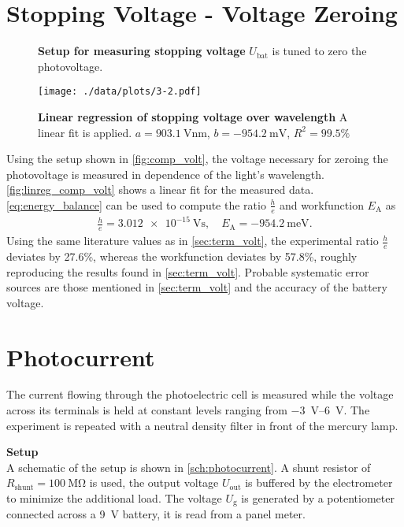 \section{Stopping Voltage - Voltage Zeroing}%
\begin{figure}[tbp]
	\centering
	\caption[Setup for measuring stopping voltage]{\textbf{Setup for measuring stopping voltage} $U_\text{bat}$ is tuned to zero the photovoltage.}
	\label{fig:comp_volt}
\end{figure}
\begin{figure}[tbp]
	\centering
	\texttt{[image: ./data/plots/3-2.pdf]}
	\caption[Linear regression of stopping voltage over wavelength]{\textbf{Linear regression of stopping voltage over wavelength} A linear fit is applied. $a=\SI{903.1}{\volt\nm}$, $b=\SI{-954.2}{\milli\V}$, $R^2=99.5\%$}
	\label{fig:linreg_comp_volt}
\end{figure}
Using the setup shown in \autoref{fig:comp_volt}, the voltage necessary for zeroing the photovoltage is measured in dependence of the light's wavelength.
\autoref{fig:linreg_comp_volt} shows a linear fit for the measured data.
\autoref{eq:energy_balance} can be used to compute the ratio $\frac{h}{e}$ and workfunction $E_\text{A}$ as
\begin{gather*}
	\frac{h}{e}=\SI{3.012e-15}{\volt\second},\quad E_\text{A}=\SI{-954.2}{\milli\eV}.
\end{gather*}
Using the same literature values as in \autoref{sec:term_volt}, the experimental ratio $\frac{h}{e}$ deviates by \num{27.6}\%, whereas the workfunction deviates by \num{57.8}\%, roughly reproducing the results found in \autoref{sec:term_volt}.
Probable systematic error sources are those mentioned in \autoref{sec:term_volt} and the accuracy of the battery voltage.

\section{Photocurrent}\label{sec:photo_current}%

The current flowing through the photoelectric cell is measured while the voltage across its terminals is held at constant levels ranging from \SIrange{-3}{6}{\volt}.
The experiment is repeated with a neutral density filter in front of the mercury lamp.

\textbf{Setup}\\
A schematic of the setup is shown in \autoref{sch:photocurrent}.
A shunt resistor of $R_\text{shunt} = \SI{100}{\mega\ohm}$ is used, the output voltage $U_\text{out}$ is buffered by the electrometer to minimize the additional load.
The voltage $U_\text{g}$ is generated by a potentiometer connected across a \SI{9}{\volt} battery, it is read from a panel meter.

